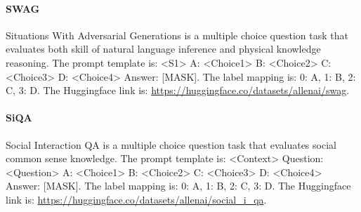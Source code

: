 \paragraph{SWAG} Situations With Adversarial Generations \citep{zellers2018swagaf} is a multiple choice question task that evaluates both skill of natural language inference and physical knowledge reasoning. The prompt template is: \textless{}S1\textgreater{} A: \textless{}Choice1\textgreater{} B: \textless{}Choice2\textgreater{} C: \textless{}Choice3\textgreater{} D: \textless{}Choice4\textgreater{} Answer: {[}MASK{]}. The label mapping is: 0: A, 1: B, 2: C, 3: D. The Huggingface link is: \url{https://huggingface.co/datasets/allenai/swag}.

\paragraph{SiQA} Social Interaction QA \citep{sap2019socialiqa} is a multiple choice question task that evaluates social common sense knowledge. The prompt template is: \textless{}Context\textgreater{} Question: \textless{}Question\textgreater{} A: \textless{}Choice1\textgreater{} B: \textless{}Choice2\textgreater{} C: \textless{}Choice3\textgreater{} 
D: \textless{}Choice4\textgreater{} Answer: {[}MASK{]}. The label mapping is: 0: A, 1: B, 2: C, 3: D. The Huggingface link is: \url{https://huggingface.co/datasets/allenai/social_i_qa}.
